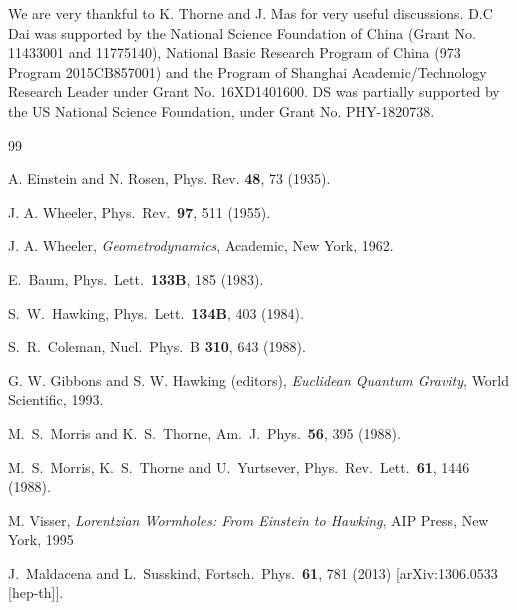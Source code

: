\documentclass[prd, amsfonts, twocolumn, nofootinbib, showpacs]{revtex4}
\begin{document}
\begin{acknowledgments}
We are very thankful to K. Thorne and J. Mas for very useful discussions.
D.C Dai was supported by the National Science Foundation of China (Grant No. 11433001 and 11775140), National Basic Research Program of China (973 Program 2015CB857001) and  the Program of Shanghai Academic/Technology Research Leader under Grant No. 16XD1401600. DS was partially supported by the US National Science Foundation, under Grant No. PHY-1820738.


\end{acknowledgments}


\begin{thebibliography}{99}

 A. Einstein and N. Rosen, Phys. Rev. {\bf 48}, 73 (1935).

 J. A. Wheeler, %
Phys.\ Rev.\ {\bf 97}, 511 (1955).

 J. A. Wheeler, {\it Geometrodynamics}, Academic, New York, 1962.

  E.~Baum,
  Phys.\ Lett.\  {\bf 133B}, 185 (1983).

  S.~W.~Hawking,
  Phys.\ Lett.\  {\bf 134B}, 403 (1984).

  S.~R.~Coleman,
  Nucl.\ Phys.\ B {\bf 310}, 643 (1988).


G. W. Gibbons and S. W. Hawking (editors), {\it Euclidean Quantum Gravity}, World Scientific, 1993.

  M.~S.~Morris and K.~S.~Thorne,
  Am.\ J.\ Phys.\  {\bf 56}, 395 (1988).

  M.~S.~Morris, K.~S.~Thorne and U.~Yurtsever,
  Phys.\ Rev.\ Lett.\  {\bf 61}, 1446 (1988).


 M. Visser, {\it Lorentzian Wormholes: From Einstein to Hawking}, AIP Press, New York, 1995


  J.~Maldacena and L.~Susskind,
  Fortsch.\ Phys.\  {\bf 61}, 781 (2013)
  [arXiv:1306.0533 [hep-th]].



\end{thebibliography}
\end{document}
